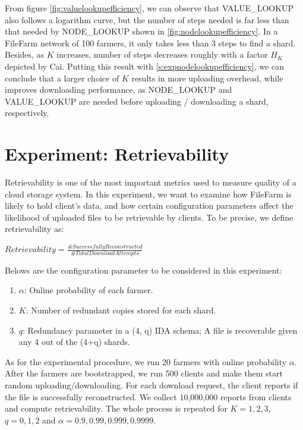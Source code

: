 From figure \ref{fig:valuelookupefficiency}, we can observe that VALUE\_LOOKUP also follows a logarithm curve, but the number of steps needed is far less than that needed by NODE\_LOOKUP shown in \ref{fig:nodelookupefficiency}. In a FileFarm network of 100 farmers, it only takes less than 3 steps to find a shard. Besides, as $K$ increases, number of steps decreases roughly with a factor $H_{K}$ depicted by Cai\cite{cai2013probabilistic}. Putting this result with \ref{s:expnodelookupefficiency}, we can conclude that a larger choice of $K$ results in more uploading overhead, while improves downloading performance, as NODE\_LOOKUP and VALUE\_LOOKUP are needed before uploading / downloading a shard, respectively.

\section{Experiment: Retrievability}
\label{s:expretrievability}

Retrievability is one of the most important metrics used to measure quality of a cloud storage system. In this experiment, we want to examine how FileFarm is likely to hold client's data, and how certain configuration parameters affect the likelihood of uploaded files to be retrievable by clients. To be precise, we define retrievability as:

\begin{center}
  $Retrievability = \frac{\# Successfully Reconstructed}{\# Total Download Attempts}$
\end{center}

\noindent Belows are the configuration parameter to be considered in this experiment:

\begin{enumerate}
  \item $\alpha$: Online probability of each farmer.
  \item $K$: Number of redundant copies stored for each shard.
  \item $q$: Redundancy parameter in a (4, q) IDA schema; A file is recoverable given any 4 out of the (4+q) shards.
\end{enumerate}

As for the experimental procedure, we run 20 farmers with online probability $\alpha$. After the farmers are bootstrapped, we run 500 clients and make them start random uploading/downloading. For each download request, the client reports if the file is successfully reconstructed. We collect 10,000,000 reports from clients and compute retrievability. The whole process is repeated for $K=1,2,3$, $q=0,1,2$ and $\alpha=0.9,0.99,0.999,0.9999$.

